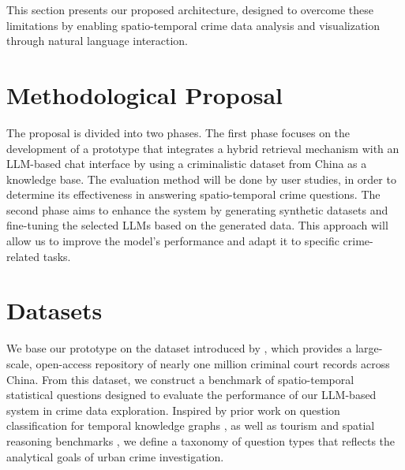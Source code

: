 This section presents our proposed architecture, designed to overcome these limitations by enabling spatio-temporal crime data analysis and visualization through natural language interaction.



\section{Methodological Proposal}

The proposal is divided into two phases. The first phase focuses on the development of a prototype that integrates a hybrid retrieval mechanism with an LLM-based chat interface by using a criminalistic dataset from China as a knowledge base. The evaluation method will be done by user studies, in order to determine its effectiveness in answering spatio-temporal crime questions. The second phase aims to enhance the system by generating synthetic datasets and fine-tuning the selected LLMs based on the generated data. This approach will allow us to improve the model's performance and adapt it to specific crime-related tasks.

\cite{Moshkov2025AIMO2}

\section{Datasets}


We base our prototype on the dataset introduced by \cite{Zhang2025CrimeDatasetChina}, which provides a large-scale, open-access repository of nearly one million criminal court records across China. From this dataset, we construct a benchmark of spatio-temporal statistical questions designed to evaluate the performance of our LLM-based system in crime data exploration. Inspired by prior work on question classification for temporal knowledge graphs \cite{Saxena2021TemporalKGQA}, as well as tourism and spatial reasoning benchmarks \cite{Contractor2020QATourism, Dai2024QASTKG}, we define a taxonomy of question types that reflects the analytical goals of urban crime investigation.

